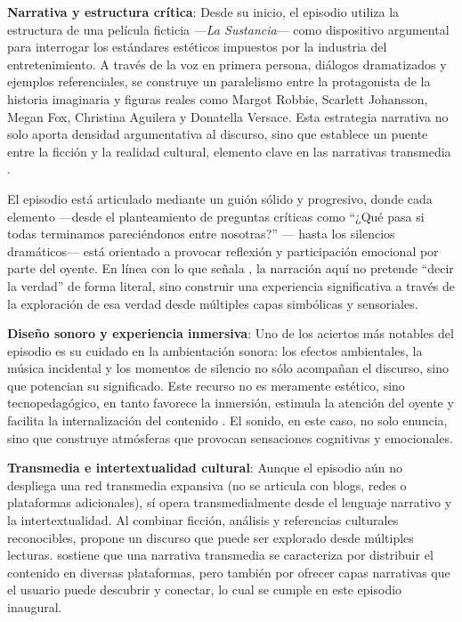 \documentclass[
  spanish,
  11pt,
  a4paper,
]{scrbook}
\begin{document}
\textbf{Narrativa y estructura crítica}: Desde su inicio, el episodio
utiliza la estructura de una película ficticia ---\emph{La Sustancia}---
como dispositivo argumental para interrogar los estándares estéticos
impuestos por la industria del entretenimiento. A través de la voz en
primera persona, diálogos dramatizados y ejemplos referenciales, se
construye un paralelismo entre la protagonista de la historia imaginaria
y figuras reales como Margot Robbie, Scarlett Johansson, Megan Fox,
Christina Aguilera y Donatella Versace. Esta estrategia narrativa no
solo aporta densidad argumentativa al discurso, sino que establece un
puente entre la ficción y la realidad cultural, elemento clave en las
narrativas transmedia \autocite{Scolari2013}.

El episodio está articulado mediante un guión sólido y progresivo, donde
cada elemento ---desde el planteamiento de preguntas críticas como
``¿Qué pasa si todas terminamos pareciéndonos entre nosotras?'' ---
hasta los silencios dramáticos--- está orientado a provocar reflexión y
participación emocional por parte del oyente. En línea con lo que señala
\autocite{Baricco2023}, la narración aquí no pretende ``decir la
verdad'' de forma literal, sino construir una experiencia significativa
a través de la exploración de esa verdad desde múltiples capas
simbólicas y sensoriales.

\textbf{Diseño sonoro y experiencia inmersiva}: Uno de los aciertos más
notables del episodio es su cuidado en la ambientación sonora: los
efectos ambientales, la música incidental y los momentos de silencio no
sólo acompañan el discurso, sino que potencian su significado. Este
recurso no es meramente estético, sino tecnopedagógico, en tanto
favorece la inmersión, estimula la atención del oyente y facilita la
internalización del contenido \autocite{McLoughlin2010}. El sonido, en
este caso, no solo enuncia, sino que construye atmósferas que provocan
sensaciones cognitivas y emocionales.

\textbf{Transmedia e intertextualidad cultural}: Aunque el episodio aún
no despliega una red transmedia expansiva (no se articula con blogs,
redes o plataformas adicionales), sí opera transmedialmente desde el
lenguaje narrativo y la intertextualidad. Al combinar ficción, análisis
y referencias culturales reconocibles, propone un discurso que puede ser
explorado desde múltiples lecturas. \textcite{Scolari2013} sostiene que
una narrativa transmedia se caracteriza por distribuir el contenido en
diversas plataformas, pero también por ofrecer capas narrativas que el
usuario puede descubrir y conectar, lo cual se cumple en este episodio
inaugural.
\end{document}
